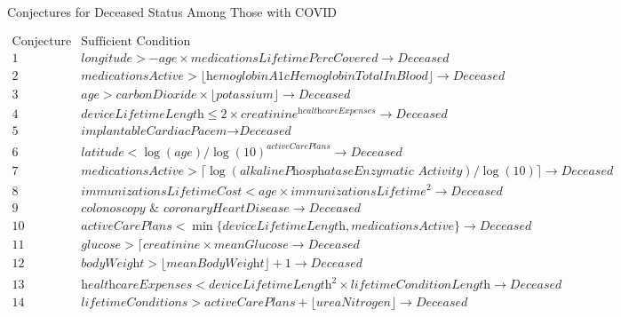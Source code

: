 \documentclass[ijds,nonblindrev]{informs-ijds}
\begin{document}
\begin{APPENDICES}
 \newpage
 
 
\begin{table}[!ht]
\caption{\label{deceased}Conjectures for Deceased Status Among Those with COVID}
{\footnotesize
\[
 \begin{array}{lr} 
\textrm{Conjecture} & \textrm{Sufficient Condition}  \\
 \hline\hline
1 & \textit{longitude} > -\textit{age} \times \textit{medicationsLifetimePercCovered}  \rightarrow \textit{Deceased} \\
2 & \textit{medicationsActive} > \lfloor \textit{hemoglobinA1cHemoglobinTotalInBlood} \rfloor \rightarrow \textit{Deceased} \\
3 & \textit{age} > \textit{carbonDioxide}\times \lfloor \textit{potassium} \rfloor \rightarrow \textit{Deceased} \\
4 & \textit{deviceLifetimeLength} \leq 2\times \textit{creatinine}^\textit{healthcareExpenses} \rightarrow \textit{Deceased} \\
5 & \textit{implantableCardiacPacem}  \rightarrow \textit{Deceased} \\
6 & \textit{latitude} < \log(\textit{age})/\log(10)^\textit{activeCarePlans}  \rightarrow \textit{Deceased} \\
7 & \textit{medicationsActive} > \lceil \log(\textit{alkalinePhosphataseEnzymatic Activity})/\log (10) \rceil \rightarrow \textit{Deceased} \\
8 & \textit{immunizationsLifetimeCost} < \textit{age} \times \textit{immunizationsLifetime}^2 \rightarrow \textit{Deceased} \\
9 & \textit{colonoscopy } \& \textit{ coronaryHeartDisease} \rightarrow \textit{Deceased} \\
10 & \textit{activeCarePlans} < \min \{ \textit{deviceLifetimeLength}, \textit{medicationsActive}\}  \rightarrow \textit{Deceased} \\
11 & \textit{glucose} > \lceil \textit{creatinine} \times \textit{meanGlucose} \rightarrow \textit{Deceased} \\
12 & \textit{bodyWeight} > \lfloor \textit{meanBodyWeight} \rfloor + 1 \rightarrow \textit{Deceased} \\
13 & \textit{healthcareExpenses} < \textit{deviceLifetimeLength}^2 \times \textit{lifetimeConditionLength} \rightarrow \textit{Deceased} \\
14 & \textit{lifetimeConditions} > \textit{activeCarePlans} + \lfloor \textit{ureaNitrogen} \rfloor \rightarrow \textit{Deceased} \\

\end{array}\]}
\end{table}
\end{APPENDICES}
\end{document}
